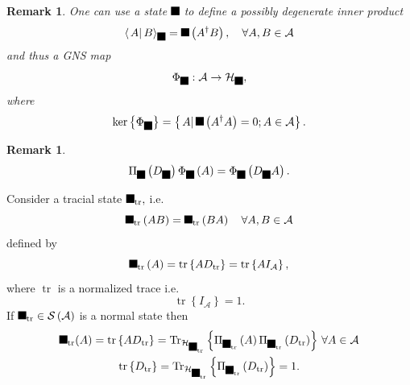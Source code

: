 \documentclass[aps,preprint]{revtex4}%
\providecommand{\U}[1]{\protect\rule{.1in}{.1in}}
\newtheorem{remark}[theorem]{Remark}
\begin{document}
\begin{remark}
One can use a state $\U{3c6} $ to define a possibly degenerate inner product
\begin{equation}
\left\langle \left.  A\right\vert B\right\rangle _{\U{3c6} }=\U{3c6} \left(
A^{\dagger}B\right)  ,\quad\forall A,B\in\mathcal{A}%
\end{equation}
and thus a GNS map%
\begin{equation}
\Phi_{\U{3c6} }:\mathcal{A\rightarrow H}_{\U{3c6} },
\end{equation}
where
\begin{equation}
\ker\left\{  \Phi_{\U{3c6} }\right\}  =\left\{  \left.  A\right\vert \U{3c6}
\left(  A^{\dagger}A\right)  =0;A\in\mathcal{A}\right\}  .
\end{equation}

\end{remark}

\begin{remark}%
\begin{equation}
\Pi_{\U{3c6} }\left(  D_{\U{3c6} }\right)  \Phi_{\U{3c6} }\left(  A\right)
=\Phi_{\U{3c6} }\left(  D_{\U{3c6} }A\right)  .
\end{equation}

\end{remark}

Consider a tracial state $\U{3c6} _{\operatorname*{tr}},$ i.e.
\begin{equation}
\U{3c6} _{\operatorname*{tr}}\left(  AB\right)  =\U{3c6} _{\operatorname*{tr}%
}\left(  BA\right)  \quad\forall A,B\in\mathcal{A}%
\end{equation}
defined by
\begin{equation}
\U{3c6} _{\operatorname*{tr}}\left(  A\right)  =\operatorname*{tr}\left\{
AD_{\operatorname*{tr}}\right\}  =\operatorname*{tr}\left\{  AI_{\mathcal{A}%
}\right\}  ,
\end{equation}
where $\operatorname*{tr}$ is a normalized trace i.e.
\begin{equation}
\operatorname*{tr}\left\{  I_{\mathcal{A}}\right\}  =1.
\end{equation}
If $\U{3c6} _{\operatorname*{tr}}\in\mathcal{S\left(  \mathcal{A}\right)  }$
is a normal state then
\begin{gather}
\U{3c6} _{\operatorname*{tr}}(A)=\operatorname*{tr}\left\{
AD_{\operatorname*{tr}}\right\}  =\operatorname{Tr}_{\mathcal{H}_{\U{3c6}
_{\operatorname*{tr}}}}\left\{  \Pi_{\U{3c6} _{\operatorname*{tr}}}\left(
A\right)  \Pi_{\U{3c6} _{\operatorname*{tr}}}\left(  D_{\operatorname*{tr}%
}\right)  \right\}  \,\forall A\in\mathcal{A}\\
\operatorname*{tr}\left\{  D_{\operatorname*{tr}}\right\}  =\operatorname{Tr}%
_{\mathcal{H}_{\U{3c6} _{\operatorname*{tr}}}}\left\{  \Pi_{\U{3c6}
_{\operatorname*{tr}}}\left(  D_{\operatorname*{tr}}\right)  \right\}  =1.
\end{gather}
\end{document}
